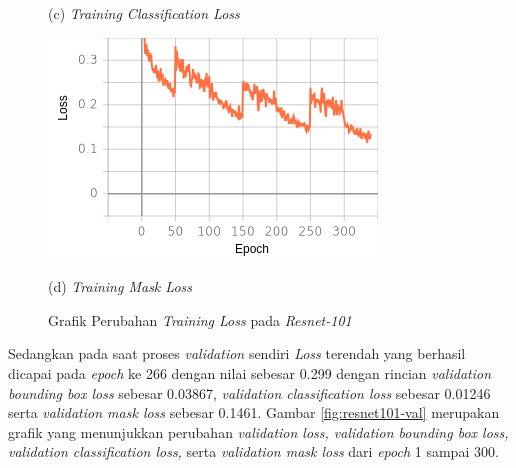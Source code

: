 \begin{figure}[H]
\begin{minipage}{0.45\textwidth}
		\caption*{(c) \textit{Training Classification Loss}}
	\end{minipage}
	\hfill
	\begin{minipage}{0.45\textwidth}
		\includegraphics[width=\textwidth]{gambar/training_resnet50/tugas-akhir-Page-15 (3).png}
		\caption*{(d) \textit{Training Mask Loss}}
	\end{minipage}
	\caption{Grafik Perubahan \textit{Training Loss} pada \textit{Resnet-101}}
	\label{fig:resnet101-training}
\end{figure}

Sedangkan pada saat proses \textit{validation} sendiri \textit{Loss} terendah yang berhasil dicapai pada \textit{epoch} ke 266 dengan nilai sebesar 0.299 dengan rincian \textit{validation bounding box loss} sebesar 0.03867, \textit{validation classification loss} sebesar 0.01246 serta \textit{validation mask loss} sebesar 0.1461. Gambar \ref{fig:resnet101-val} merupakan grafik yang menunjukkan perubahan \textit{validation loss, validation bounding box loss, validation classification loss,} serta \textit{validation mask loss} dari \textit{epoch} 1 sampai 300.

